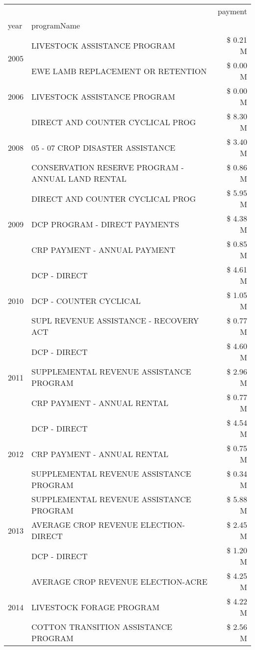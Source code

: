 \begin{tabular}{llr}
\toprule
 &  & payment \\
year & programName &  \\
\midrule
\multirow[t]{2}{*}{2005} & LIVESTOCK ASSISTANCE PROGRAM & \$ 0.21 M \\
 & EWE LAMB REPLACEMENT OR RETENTION & \$ 0.00 M \\
\cline{1-3}
2006 & LIVESTOCK ASSISTANCE PROGRAM & \$ 0.00 M \\
\cline{1-3}
\multirow[t]{3}{*}{2008} & DIRECT AND COUNTER CYCLICAL PROG & \$ 8.30 M \\
 & 05 - 07 CROP DISASTER ASSISTANCE & \$ 3.40 M \\
 & CONSERVATION RESERVE PROGRAM - ANNUAL LAND RENTAL & \$ 0.86 M \\
\cline{1-3}
\multirow[t]{3}{*}{2009} & DIRECT AND COUNTER CYCLICAL PROG & \$ 5.95 M \\
 & DCP PROGRAM - DIRECT PAYMENTS & \$ 4.38 M \\
 & CRP PAYMENT - ANNUAL PAYMENT & \$ 0.85 M \\
\cline{1-3}
\multirow[t]{3}{*}{2010} & DCP - DIRECT & \$ 4.61 M \\
 & DCP - COUNTER CYCLICAL & \$ 1.05 M \\
 & SUPL REVENUE ASSISTANCE - RECOVERY ACT & \$ 0.77 M \\
\cline{1-3}
\multirow[t]{3}{*}{2011} & DCP - DIRECT & \$ 4.60 M \\
 & SUPPLEMENTAL REVENUE ASSISTANCE PROGRAM & \$ 2.96 M \\
 & CRP PAYMENT - ANNUAL RENTAL & \$ 0.77 M \\
\cline{1-3}
\multirow[t]{3}{*}{2012} & DCP - DIRECT & \$ 4.54 M \\
 & CRP PAYMENT - ANNUAL RENTAL & \$ 0.75 M \\
 & SUPPLEMENTAL REVENUE ASSISTANCE PROGRAM & \$ 0.34 M \\
\cline{1-3}
\multirow[t]{3}{*}{2013} & SUPPLEMENTAL REVENUE ASSISTANCE PROGRAM & \$ 5.88 M \\
 & AVERAGE CROP REVENUE ELECTION-DIRECT & \$ 2.45 M \\
 & DCP - DIRECT & \$ 1.20 M \\
\cline{1-3}
\multirow[t]{3}{*}{2014} & AVERAGE CROP REVENUE ELECTION-ACRE & \$ 4.25 M \\
 & LIVESTOCK FORAGE PROGRAM & \$ 4.22 M \\
 & COTTON TRANSITION ASSISTANCE PROGRAM & \$ 2.56 M \\

\end{tabular}
